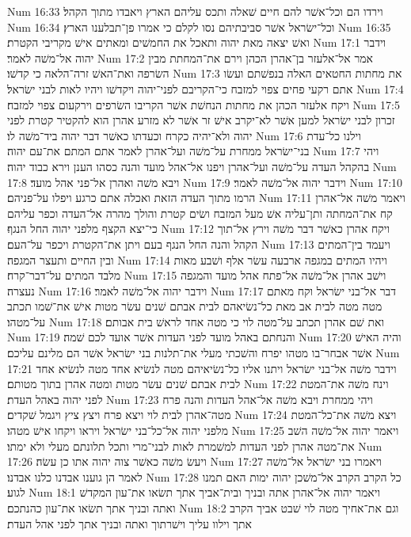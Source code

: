 Num 16:33  וירדו הם וכל־אשׁר להם חיים שׁאלה ותכס עליהם הארץ ויאבדו מתוך הקהל׃
Num 16:34  וכל־ישׂראל אשׁר סביבתיהם נסו לקלם כי אמרו פן־תבלענו הארץ׃
Num 16:35  ואשׁ יצאה מאת יהוה ותאכל את החמשׁים ומאתים אישׁ מקריבי הקטרת׃
Num 17:1  וידבר יהוה אל־משׁה לאמר׃
Num 17:2  אמר אל־אלעזר בן־אהרן הכהן וירם את־המחתת מבין השׂרפה ואת־האשׁ זרה־הלאה כי קדשׁו׃
Num 17:3  את מחתות החטאים האלה בנפשׁתם ועשׂו אתם רקעי פחים צפוי למזבח כי־הקריבם לפני־יהוה ויקדשׁו ויהיו לאות לבני ישׂראל׃
Num 17:4  ויקח אלעזר הכהן את מחתות הנחשׁת אשׁר הקריבו השׂרפים וירקעום צפוי למזבח׃
Num 17:5  זכרון לבני ישׂראל למען אשׁר לא־יקרב אישׁ זר אשׁר לא מזרע אהרן הוא להקטיר קטרת לפני יהוה ולא־יהיה כקרח וכעדתו כאשׁר דבר יהוה ביד־משׁה לו׃
Num 17:6  וילנו כל־עדת בני־ישׂראל ממחרת על־משׁה ועל־אהרן לאמר אתם המתם את־עם יהוה׃
Num 17:7  ויהי בהקהל העדה על־משׁה ועל־אהרן ויפנו אל־אהל מועד והנה כסהו הענן וירא כבוד יהוה׃
Num 17:8  ויבא משׁה ואהרן אל־פני אהל מועד׃
Num 17:9  וידבר יהוה אל־משׁה לאמר׃
Num 17:10  הרמו מתוך העדה הזאת ואכלה אתם כרגע ויפלו על־פניהם׃
Num 17:11  ויאמר משׁה אל־אהרן קח את־המחתה ותן־עליה אשׁ מעל המזבח ושׂים קטרת והולך מהרה אל־העדה וכפר עליהם כי־יצא הקצף מלפני יהוה החל הנגף׃
Num 17:12  ויקח אהרן כאשׁר דבר משׁה וירץ אל־תוך הקהל והנה החל הנגף בעם ויתן את־הקטרת ויכפר על־העם׃
Num 17:13  ויעמד בין־המתים ובין החיים ותעצר המגפה׃
Num 17:14  ויהיו המתים במגפה ארבעה עשׂר אלף ושׁבע מאות מלבד המתים על־דבר־קרח׃
Num 17:15  וישׁב אהרן אל־משׁה אל־פתח אהל מועד והמגפה נעצרה׃
Num 17:16  וידבר יהוה אל־משׁה לאמר׃
Num 17:17  דבר אל־בני ישׂראל וקח מאתם מטה מטה לבית אב מאת כל־נשׂיאהם לבית אבתם שׁנים עשׂר מטות אישׁ את־שׁמו תכתב על־מטהו׃
Num 17:18  ואת שׁם אהרן תכתב על־מטה לוי כי מטה אחד לראשׁ בית אבותם׃
Num 17:19  והנחתם באהל מועד לפני העדות אשׁר אועד לכם שׁמה׃
Num 17:20  והיה האישׁ אשׁר אבחר־בו מטהו יפרח והשׁכתי מעלי את־תלנות בני ישׂראל אשׁר הם מלינם עליכם׃
Num 17:21  וידבר משׁה אל־בני ישׂראל ויתנו אליו כל־נשׂיאיהם מטה לנשׂיא אחד מטה לנשׂיא אחד לבית אבתם שׁנים עשׂר מטות ומטה אהרן בתוך מטותם׃
Num 17:22  וינח משׁה את־המטת לפני יהוה באהל העדת׃
Num 17:23  ויהי ממחרת ויבא משׁה אל־אהל העדות והנה פרח מטה־אהרן לבית לוי ויצא פרח ויצץ ציץ ויגמל שׁקדים׃
Num 17:24  ויצא משׁה את־כל־המטת מלפני יהוה אל־כל־בני ישׂראל ויראו ויקחו אישׁ מטהו׃
Num 17:25  ויאמר יהוה אל־משׁה השׁב את־מטה אהרן לפני העדות למשׁמרת לאות לבני־מרי ותכל תלונתם מעלי ולא ימתו׃
Num 17:26  ויעשׂ משׁה כאשׁר צוה יהוה אתו כן עשׂה׃
Num 17:27  ויאמרו בני ישׂראל אל־משׁה לאמר הן גוענו אבדנו כלנו אבדנו׃
Num 17:28  כל הקרב הקרב אל־משׁכן יהוה ימות האם תמנו לגוע׃
Num 18:1  ויאמר יהוה אל־אהרן אתה ובניך ובית־אביך אתך תשׂאו את־עון המקדשׁ ואתה ובניך אתך תשׂאו את־עון כהנתכם׃
Num 18:2  וגם את־אחיך מטה לוי שׁבט אביך הקרב אתך וילוו עליך וישׁרתוך ואתה ובניך אתך לפני אהל העדת׃
